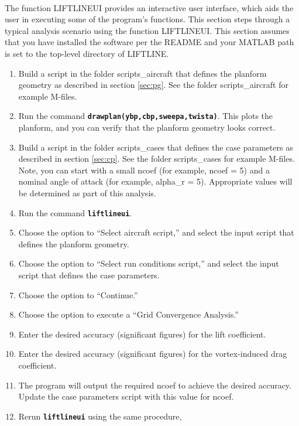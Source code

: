 \documentclass{article}
\begin{document}
\paragraph{}
The function LIFTLINEUI provides an interactive user interface, which
aids the user in executing some of the program's functions.  This
section steps through a typical analysis scenario using the function
LIFTLINEUI.  This section assumes that you have installed the software
per the README and your MATLAB path is set to the top-level directory
of LIFTLINE.
\begin{enumerate}
  \item Build a script in the folder scripts\_aircraft that defines
    the planform geometry as described in section \ref{sec:pg}.  See
    the folder scripts\_aircraft for example M-files.
  \item Run the command
    \texttt{\textbf{drawplan(ybp,cbp,sweepa,twista)}}.  This plots the
    planform, and you can verify that the planform geometry looks
    correct.
  \item Build a script in the folder scripts\_cases that defines the
    case parameters as described in section \ref{sec:cp}.  See the
    folder scripts\_cases for example M-files.  Note, you can start
    with a small ncoef (for example, ncoef = 5) and a nominal angle of
    attack (for example, alpha\_r = 5).  Appropriate values will be
    determined as part of this analysis.
  \item Run the command \texttt{\textbf{liftlineui}}.
  \item Choose the option to ``Select aircraft script,'' and select
    the input script that defines the planform geometry.
  \item Choose the option to ``Select run conditions script,'' and
    select the input script that defines the case parameters.
  \item Choose the option to ``Continue.''
  \item Choose the option to execute a ``Grid Convergence Analysis.''
  \item Enter the desired accuracy (significant figures) for the lift
    coefficient.
  \item Enter the desired accuracy (significant figures) for the
    vortex-induced drag coefficient.
  \item The program will output the required ncoef to achieve the
    desired accuracy.  Update the case parameters script with this
    value for ncoef.
  \item Rerun \texttt{\textbf{liftlineui}} using the same procedure,

\end{enumerate}
\end{document}
